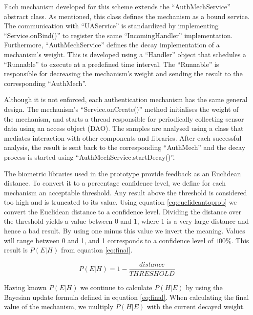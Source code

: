 Each mechanism developed for this scheme extends the ``AuthMechService'' abstract class. As mentioned, this class defines the mechanism as a bound service. The communication with ``UAService'' is standardized by implementing ``Service.onBind()'' to register the same ``IncomingHandler'' implementation. Furthermore, ``AuthMechService'' defines the decay implementation of a mechanism's weight. This is developed using a ``Handler'' object that schedules a ``Runnable'' to execute at a predefined time interval. The ``Runnable'' is responsible for decreasing the mechanism's weight and sending the result to the corresponding ``AuthMech''.

Although it is not enforced, each authentication mechanism has the same general design. The mechanism's ``Service.onCreate()'' method initialises the weight of the mechanism, and starts a thread responsible for periodically collecting sensor data using an access object (DAO). The samples are analysed using a class that mediates interaction with other components and libraries. After each successful analysis, the result is sent back to the corresponding ``AuthMech'' and the decay process is started using ``AuthMechService.startDecay()''.

The biometric libraries used in the prototype provide feedback as an Euclidean distance. To convert it to a percentage confidence level, we define for each mechanism an acceptable threshold. Any result above the threshold is considered too high and is truncated to its value. Using equation \ref{eq:euclideantoprob} we convert the Euclidean distance to a confidence level. Dividing the distance over the threshold yields a value between 0 and 1, where 1 is a very large distance and hence a bad result. By using one minus this value we invert the meaning. Values will range between 0 and 1, and 1 corresponds to a confidence level of $100\%$. This result is $P(E|H)$ from equation \ref{eq:final}.

\begin{equation} 
\label{eq:euclideantoprob}
P(E|H) = 1 - \frac{distance}{THRESHOLD}
\end{equation}

Having known $P(E|H)$ we continue to calculate $P(H|E)$ by using the Bayesian update formula defined in equation \ref{eq:final}. When calculating the final value of the mechanism, we multiply $P(H|E)$ with the current decayed weight.

